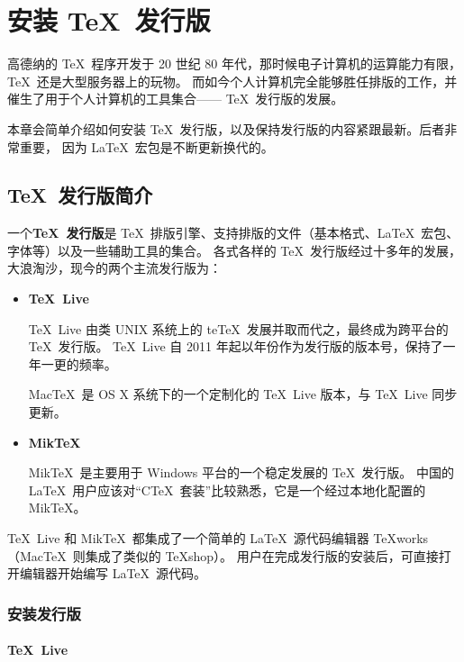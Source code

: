 \chapter{安装 \protect\TeX\ 发行版}\label{app:install}

\begin{intro}
高德纳的 \TeX\ 程序开发于 20 世纪 80 年代，那时候电子计算机的运算能力有限，\TeX\ 还是大型服务器上的玩物。
而如今个人计算机完全能够胜任排版的工作，并催生了用于个人计算机的工具集合—— \TeX\ 发行版的发展。

本章会简单介绍如何安装 \TeX\ 发行版，以及保持发行版的内容紧跟最新。后者非常重要，
因为 \LaTeX\ 宏包是不断更新换代的。
\end{intro}

\section{\protect\TeX\ 发行版简介}\label{sec:dists}

一个\textbf{\TeX\ 发行版}是 \TeX\ 排版引擎、支持排版的文件（基本格式、\LaTeX\ 宏包、字体等）以及一些辅助工具的集合。
各式各样的 \TeX\ 发行版经过十多年的发展，大浪淘沙，现今的两个主流发行版为：
\begin{itemize}
  \item \textbf{\TeX\ Live}\par
  \TeX\ Live 由类 UNIX 系统上的 te\TeX\ 发展并取而代之，最终成为跨平台的 \TeX\ 发行版。
  \TeX\ Live 自 2011 年起以年份作为发行版的版本号，保持了一年一更的频率。

  Mac\TeX\ 是 OS X 系统下的一个定制化的 \TeX\ Live 版本，与 \TeX\ Live 同步更新。

  \item \textbf{Mik\TeX}\par
  Mik\TeX\ 是主要用于 Windows 平台的一个稳定发展的 \TeX\ 发行版。
  中国的 \LaTeX\ 用户应该对“C\TeX\ 套装”比较熟悉，它是一个经过本地化配置的 Mik\TeX 。
\end{itemize}

\TeX\ Live 和 Mik\TeX\ 都集成了一个简单的 \LaTeX\ 源代码编辑器 \TeX works（Mac\TeX\ 则集成了类似的 \TeX shop）。
用户在完成发行版的安装后，可直接打开编辑器开始编写 \LaTeX\ 源代码。

\subsection{安装发行版}\label{subsec:install-dists}

\subsubsection{\TeX\ Live}

